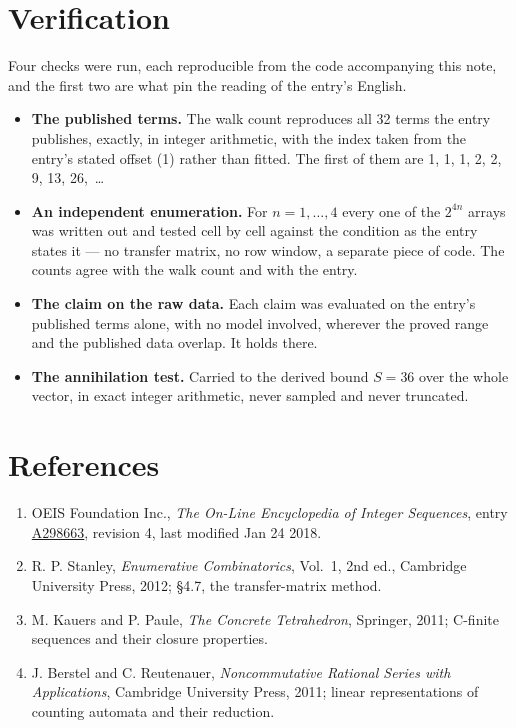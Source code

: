 \documentclass[11pt]{article}
\theoremstyle{definition}
\begin{document}
\section{Verification}

Four checks were run, each reproducible from the code accompanying this note, and the first two are what pin the reading of the entry's English.

\begin{itemize}

\item {\bfseries The published terms.} The walk count reproduces all 32 terms the entry publishes, exactly, in integer arithmetic, with the index taken from the entry's stated offset (1) rather than fitted. The first of them are 1, 1, 1, 2, 2, 9, 13, 26,~\dots

\item {\bfseries An independent enumeration.} For $n = 1,\dots,4$ every one of the $2^{4n}$ arrays was written out and tested cell by cell against the condition as the entry states it --- no transfer matrix, no row window, a separate piece of code. The counts agree with the walk count and with the entry.

\item {\bfseries The claim on the raw data.} Each claim was evaluated on the entry's published terms alone, with no model involved, wherever the proved range and the published data overlap. It holds there.

\item {\bfseries The annihilation test.} Carried to the derived bound $S = 36$ over the whole vector, in exact integer arithmetic, never sampled and never truncated.

\end{itemize}

\section{References}

\begin{enumerate}

\item OEIS Foundation Inc., \emph{The On-Line Encyclopedia of Integer Sequences}, entry \href{https://oeis.org/A298663}{A298663}, revision 4, last modified Jan 24 2018.

\item R. P. Stanley, \emph{Enumerative Combinatorics}, Vol.~1, 2nd ed., Cambridge University Press, 2012; \S4.7, the transfer-matrix method.

\item M. Kauers and P. Paule, \emph{The Concrete Tetrahedron}, Springer, 2011; C-finite sequences and their closure properties.

\item J. Berstel and C. Reutenauer, \emph{Noncommutative Rational Series with Applications}, Cambridge University Press, 2011; linear representations of counting automata and their reduction.

\end{enumerate}
\end{document}
